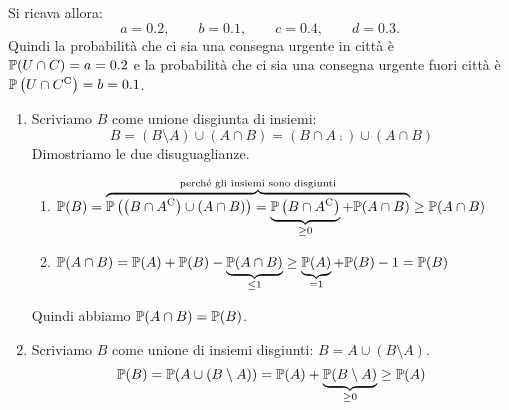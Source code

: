 Si ricava allora:
\begin{equation*}
	a=0.2,\qquad b=0.1,\qquad c=0.4,\qquad d=0.3.
\end{equation*}
Quindi la probabilità che ci sia una consegna urgente in città è $\mathbb{P}( U\cap C) =a=0.2$ e la probabilità che ci sia una consegna urgente fuori città è $\mathbb{P}\left( U\cap C^{\mathrm{C}}\right) =b=0.1$.

\Soluzione

\begin{enumerate}
	\item Scriviamo $B$ come unione disgiunta di insiemi:
	\[
		B=( B\setminus A) \cup ( A\cap B) =\left( B\cap A\comp\right) \cup ( A\cap B)
	\]
	Dimostriamo le due disuguaglianze.
	\begin{enumerate}
		\item $\mathbb{P}( B) =\overbrace{\mathbb{P}\left(\left( B\cap A^{\mathrm{C}}\right) \cup ( A\cap B)\right) =\underbrace{\mathbb{P}\left( B\cap A^{\mathrm{C}}\right)}_{\geq 0} +\mathbb{P}( A\cap B)}^{\text{perché gli insiemi sono disgiunti}} \geq \mathbb{P}( A\cap B)$
		\item $\mathbb{P}( A\cap B) =\mathbb{P}( A) +\mathbb{P}( B) -\underbrace{\mathbb{P}( A\cap B)}_{\leq 1} \geq \underbrace{\mathbb{P}( A)}_{=1} +\mathbb{P}( B) -1=\mathbb{P}( B)$
	\end{enumerate}
	Quindi abbiamo $\mathbb{P}( A\cap B) =\mathbb{P}( B)$.
	\item Scriviamo $B$ come unione di insiemi disgiunti: $B=A\cup ( B\setminus A)$.
	\[
		\mathbb{P}( B) =\mathbb{P}( A\cup ( B\setminus A)) =\mathbb{P}( A) +\underbrace{\mathbb{P}( B\setminus A)}_{\geq 0} \geq \mathbb{P}( A)
	\]
\end{enumerate}

\Soluzione

